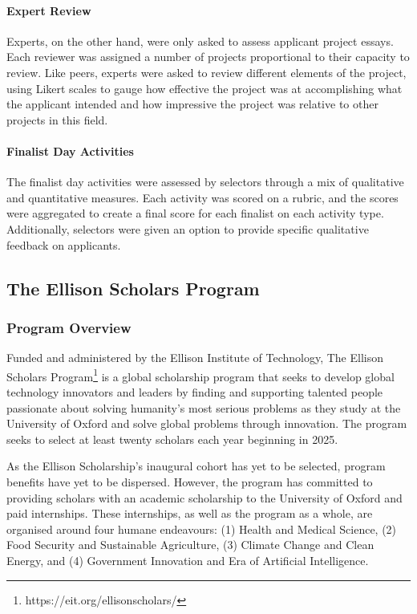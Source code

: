 \paragraph{Expert Review} 
Experts, on the other hand, were only asked to assess applicant project essays. Each reviewer was assigned a number of projects proportional to their capacity to review. Like peers, experts were asked to review different elements of the project, using Likert scales to gauge how effective the project was at accomplishing what the applicant intended and how impressive the project was relative to other projects in this field. 

\paragraph{Finalist Day Activities}
The finalist day activities were assessed by selectors through a mix of qualitative and quantitative measures. Each activity was scored on a rubric, and the scores were aggregated to create a final score for each finalist on each activity type. Additionally, selectors were given an option to provide specific qualitative feedback on applicants.

\subsection{The Ellison Scholars Program}\label{ssec:ellison}
\subsubsection{Program Overview}
Funded and administered by the Ellison Institute of Technology, The Ellison Scholars Program\footnote{https://eit.org/ellisonscholars/} is a global scholarship program that seeks to develop global technology innovators and leaders by finding and supporting talented people passionate about solving humanity’s most serious problems as they study at the University of Oxford and solve global problems through innovation. The program seeks to select at least twenty scholars each year beginning in 2025.

As the Ellison Scholarship's inaugural cohort has yet to be selected, program benefits have yet to be dispersed. However, the program has committed to providing scholars with an academic scholarship to the University of Oxford and paid internships. These internships, as well as the program as a whole, are organised around four humane endeavours: (1) Health and Medical Science, (2) Food Security and Sustainable Agriculture, (3) Climate Change and Clean Energy, and (4) Government Innovation and Era of Artificial Intelligence.

